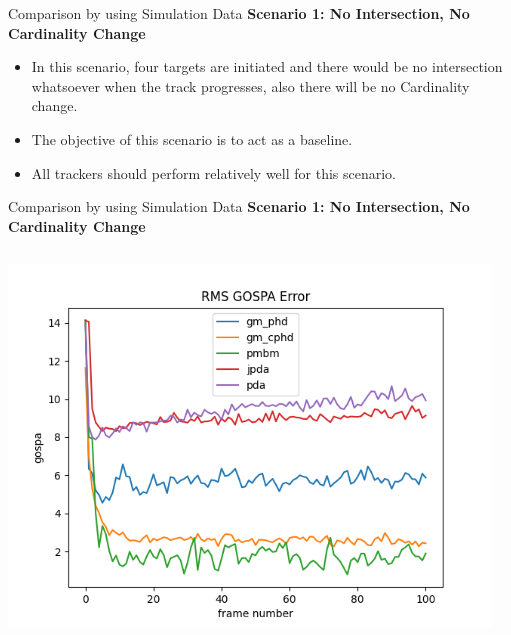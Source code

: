 \documentclass[12pt]{beamer}
\let\olditem\item
\renewcommand\item{\olditem\justifying}
\begin{document}
\begin{frame}{Comparison by using Simulation Data}
\textbf{Scenario 1: No Intersection, No Cardinality Change}
	\begin{itemize}
		    \item In this scenario, four targets are initiated and there would be no intersection whatsoever when the track progresses, also there will be no Cardinality change. 
		    \item The objective of this scenario is to act as a baseline. 
		    \item All trackers should perform relatively well for this scenario.
	\end{itemize}
\end{frame}

\begin{frame}{Comparison by using Simulation Data}
\textbf{Scenario 1: No Intersection, No Cardinality Change}
\begin{columns}[t]
  \begin{column}{0.5\linewidth}
      \centering
      \includegraphics[width=\linewidth,height=\textheight,keepaspectratio]{real_data/scenario1/gospa.png}\\
  \end{column}
    \begin{column}{0.5\linewidth}
      \centering

\end{column}
\end{columns}
\end{frame}
\end{document}
